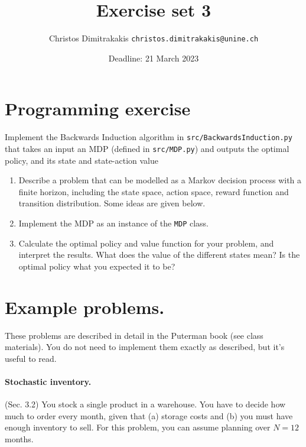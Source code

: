 \documentclass[twoside,a4paper]{article}
\begin{document}
\title{Exercise set 3}
\author{Christos Dimitrakakis  \texttt{christos.dimitrakakis@unine.ch}}
\date{Deadline: 21 March 2023}
\maketitle

\section{Programming exercise}
\begin{exercise}[In class] Implement the Backwards Induction algorithm in \verb!src/BackwardsInduction.py! that takes an input an MDP (defined in \verb|src/MDP.py|) and outputs the optimal policy, and its state and state-action value
\end{exercise}

\begin{exercise}
  \begin{enumerate}  
  \item Describe a problem that can be modelled as a Markov decision process with a finite horizon, including the state space, action space, reward function and transition distribution. Some ideas are given below.
  \item Implement the MDP as an instance of the \verb|MDP| class.
  \item Calculate the optimal policy and value function for your problem, and interpret the results. What does the value of the different states mean? Is the optimal policy what you expected it to be? 
  \end{enumerate}
\end{exercise}

\iftrue
  \section{Example problems.}
  These problems are described in detail in the Puterman book (see class materials). You do not need to implement them exactly as described, but it's useful to read.
  
  \paragraph{Stochastic inventory.}  (Sec. 3.2) You stock a single product in a warehouse. You have to decide how much to order every month, given that (a) storage costs and (b) you must have enough inventory to sell. For this problem, you can assume planning over $N=12$ months. 
\end{document}

